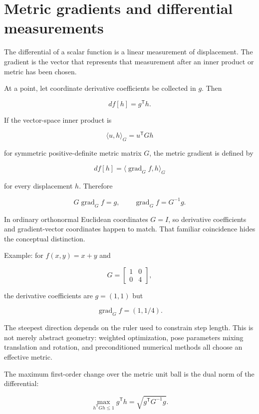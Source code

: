 \hypertarget{appendix-f4acdb1d5563}{}\label{referencestart:appendix-f4acdb1d5563}
\section{Metric gradients and differential measurements}\label{appendix-f4acdb1d5563-metric-gradients-and-differential-measurements}

The differential of a scalar function is a linear measurement of displacement. The gradient is the vector that represents that measurement after an inner product or metric has been chosen.

At a point, let coordinate derivative coefficients be collected in \(g\). Then

\[
df[h]=g^{\mathsf T}h.
\]

If the vector-space inner product is

\[
\langle u,h\rangle_G=u^{\mathsf T}Gh
\]

for symmetric positive-definite metric matrix \(G\), the metric gradient is defined by

\[
df[h]=\langle \operatorname{grad}_G f,h\rangle_G
\]

for every displacement \(h\). Therefore

\[
G\operatorname{grad}_G f=g,
\qquad
\operatorname{grad}_G f=G^{-1}g.
\]

In ordinary orthonormal Euclidean coordinates \(G=I\), so derivative coefficients and gradient-vector coordinates happen to match. That familiar coincidence hides the conceptual distinction.

Example: for \(f(x,y)=x+y\) and

\[
G=\begin{bmatrix}1&0\\0&4\end{bmatrix},
\]

the derivative coefficients are \(g=(1,1)\) but

\[
\operatorname{grad}_G f=(1,1/4).
\]

The steepest direction depends on the ruler used to constrain step length. This is not merely abstract geometry: weighted optimization, pose parameters mixing translation and rotation, and preconditioned numerical methods all choose an effective metric.

The maximum first-order change over the metric unit ball is the dual norm of the differential:

\[
\max_{h^{\mathsf T}Gh\le1} g^{\mathsf T}h
=
\sqrt{g^{\mathsf T}G^{-1}g}.
\]

